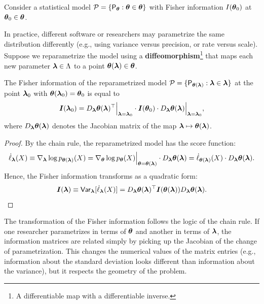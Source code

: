 Consider a statistical model \(\mathcal{P} = \{ \mathsf{P}_{\boldsymbol{\theta}} : \boldsymbol{\boldsymbol{\theta}} \in \boldsymbol{\theta} \}\) with Fisher information \(I(\boldsymbol{\theta}_0)\) at \(\boldsymbol{\theta}_0 \in \boldsymbol{\theta}\).

In practice, different software or researchers may parametrize the same distribution differently (e.g., using variance versus precision, or rate versus scale). Suppose we reparametrize the model using a \textbf{diffeomorphism}\footnote{A differentiable map with a differentiable inverse.} that maps each new parameter \(\boldsymbol{\lambda} \in \Lambda\) to a point \(\boldsymbol{\theta}(\boldsymbol{\lambda}) \in \boldsymbol{\theta}\).

\begin{pro}
    \label{pro:crb}
    The Fisher information of the reparametrized model \(\mathcal{P} = \{\mathsf{P}_{\boldsymbol{\theta}(\boldsymbol{\lambda})} : \boldsymbol{\lambda} \in \boldsymbol{\lambda}\}\) at the point \(\boldsymbol{\lambda}_0\) with \(\boldsymbol{\theta}(\boldsymbol{\lambda}_0) = \boldsymbol{\theta}_0\) is equal to
    \[
    \boldsymbol{I}(\boldsymbol{\lambda}_0) = D_{\boldsymbol{\lambda}} \boldsymbol{\theta}(\boldsymbol{\lambda})^{\top} \Big|_{\boldsymbol{\lambda} = \boldsymbol{\lambda}_0} \cdot \boldsymbol{I}(\boldsymbol{\theta}_0) \cdot D_{\boldsymbol{\lambda}} \boldsymbol{\theta}(\boldsymbol{\lambda}) \Big|_{\boldsymbol{\lambda} = \boldsymbol{\lambda}_0},
    \]
    where \(D_{\boldsymbol{\lambda}}\boldsymbol{\theta}(\boldsymbol{\lambda})\) denotes the Jacobian matrix of the map \(\boldsymbol{\lambda} \mapsto \boldsymbol{\theta}(\boldsymbol{\lambda})\).
\end{pro}

\begin{proof}
    By the chain rule, the reparametrized model has the score function:
    \[
    \dot{\ell}_{\boldsymbol{\lambda}}(X) \equiv \nabla_{\boldsymbol{\lambda}} \log p_{\boldsymbol{\theta}(\boldsymbol{\lambda})}(X) = \nabla_{\boldsymbol{\theta}} \log p_{\boldsymbol{\theta}}(X)\Big|_{\boldsymbol{\theta}=\boldsymbol{\theta}(\boldsymbol{\lambda})} \cdot D_{\boldsymbol{\lambda}}\boldsymbol{\theta}(\boldsymbol{\lambda}) = \dot{\ell}_{\boldsymbol{\theta}(\boldsymbol{\lambda})}(X) \cdot D_{\boldsymbol{\lambda}}\boldsymbol{\theta}(\boldsymbol{\lambda}).
    \]
    Hence, the Fisher information transforms as a quadratic form:
    \[
    \boldsymbol{I}(\boldsymbol{\boldsymbol{\lambda}}) \equiv \mathsf{Var}_{\boldsymbol{\boldsymbol{\lambda}}}[\dot{\ell}_{\boldsymbol{\boldsymbol{\lambda}}}(X)] = D_{\boldsymbol{\boldsymbol{\lambda}}} \boldsymbol{\theta}(\boldsymbol{\boldsymbol{\lambda}})^{\top} \boldsymbol{I}(\boldsymbol{\theta}(\boldsymbol{\boldsymbol{\lambda}})) D_{\boldsymbol{\boldsymbol{\lambda}}} \boldsymbol{\theta}(\boldsymbol{\boldsymbol{\lambda}}).
    \]
\end{proof}

\begin{remark}
    The transformation of the Fisher information follows the logic of the chain rule. If one researcher parametrizes in terms of \(\boldsymbol{\theta}\) and another in terms of \(\boldsymbol{\lambda}\), the information matrices are related simply by picking up the Jacobian of the change of parametrization. This changes the numerical values of the matrix entries (e.g., information about the standard deviation looks different than information about the variance), but it respects the geometry of the problem.
\end{remark}

